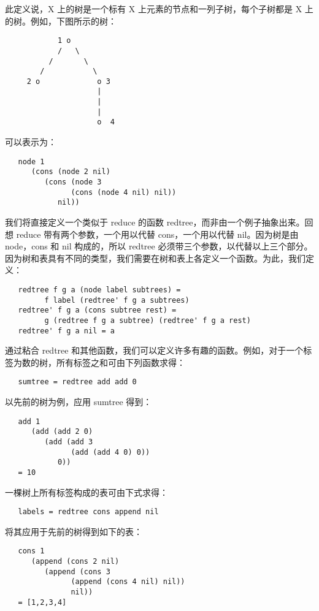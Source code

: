 \documentclass[12pt,a4paper]{article}
\begin{document}
此定义说，X 上的树是一个标有 X 上元素的节点和一列子树，每个子树都是 X 上的树。例如，下图所示的树：

\begin{verbatim}
            1 o
            /   \
          /       \
        /           \
     2 o             o 3
                     |
                     |
                     |
                     o  4
\end{verbatim}

可以表示为：

\begin{verbatim}
   node 1 
      (cons (node 2 nil)
         (cons (node 3
               (cons (node 4 nil) nil))
            nil))
\end{verbatim}

我们将直接定义一个类似于 reduce 的函数 redtree，而非由一个例子抽象出来。回想 reduce 带有两个参数，一个用以代替 cons，一个用以代替 nil。因为树是由 node，cons 和 nil 构成的，所以 redtree 必须带三个参数，以代替以上三个部分。因为树和表具有不同的类型，我们需要在树和表上各定义一个函数。为此，我们定义：

\begin{verbatim}
   redtree f g a (node label subtrees) =
         f label (redtree' f g a subtrees)
   redtree' f g a (cons subtree rest) = 
         g (redtree f g a subtree) (redtree' f g a rest)
   redtree' f g a nil = a
\end{verbatim}

通过粘合 redtree 和其他函数，我们可以定义许多有趣的函数。例如，对于一个标签为数的树，所有标签之和可由下列函数求得：
 
\begin{verbatim}
   sumtree = redtree add add 0
\end{verbatim}

以先前的树为例，应用 sumtree 得到：

\begin{verbatim}
   add 1
      (add (add 2 0)
         (add (add 3 
               (add (add 4 0) 0))
            0))
   = 10
\end{verbatim}

一棵树上所有标签构成的表可由下式求得：

\begin{verbatim}
   labels = redtree cons append nil
\end{verbatim}

将其应用于先前的树得到如下的表：

\begin{verbatim}
   cons 1
      (append (cons 2 nil)
         (append (cons 3
               (append (cons 4 nil) nil))
               nil))
   = [1,2,3,4]
\end{verbatim}
\end{document}
